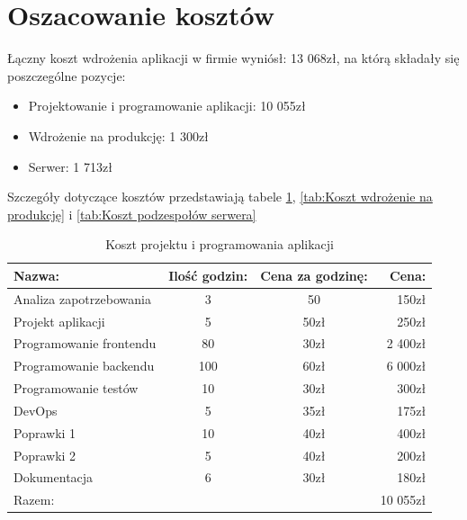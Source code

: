 \documentclass[12pt,a4paper]{article}
\begin{document}
	\section{Oszacowanie kosztów}
		\indent Łączny koszt wdrożenia aplikacji w firmie wyniósł: 13 068zł, na którą składały się poszczególne pozycje:
		\begin{itemize}
			\item Projektowanie i programowanie aplikacji: 10 055zł
			\item Wdrożenie na produkcję: 1 300zł
			\item Serwer: 1 713zł
		\end{itemize}
		Szczegóły dotyczące kosztów przedstawiają tabele \ref{tab:Koszt projektu i programowania aplikacji}, \ref{tab:Koszt wdrożenie na produkcję} i \ref{tab:Koszt podzespołów serwera} 
		\begin{table}[!hbp]
			\center
			\begin{tabular}{|l|c|c|r|}
				\hline
				Nazwa: & Ilość godzin: & Cena za godzinę: & Cena: \\
				\hline
				Analiza zapotrzebowania & 3 & 50 & 150zł\\
				\hline
				Projekt aplikacji & 5 & 50zł & 250zł\\
				\hline
				Programowanie frontendu & 80 & 30zł & 2 400zł\\
				\hline
				Programowanie backendu & 100 & 60zł & 6 000zł\\
				\hline
				Programowanie testów & 10 & 30zł & 300zł\\
				\hline
				DevOps & 5 & 35zł & 175zł\\
				\hline
				Poprawki 1 & 10 & 40zł & 400zł\\
				\hline
				Poprawki 2 & 5 & 40zł & 200zł\\
				\hline
				Dokumentacja & 6 & 30zł & 180zł\\
				\hline
				\multicolumn{3}{|l|}{Razem:} & 10 055zł\\
				\hline
			\end{tabular}
			\caption{Koszt projektu i programowania aplikacji}
			\label{tab:Koszt projektu i programowania aplikacji}
		\end{table}		
				
\end{document}
